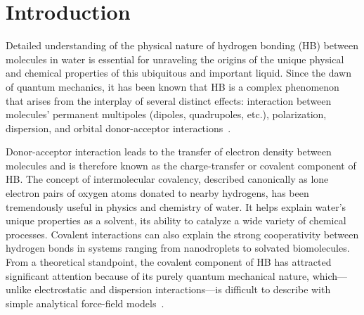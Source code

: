 \documentclass[aps,prl,reprint,amsmath,amssymb]{revtex4-1}
\begin{document}
\maketitle


\section{Introduction} 

Detailed understanding of the physical nature of hydrogen bonding (HB) between molecules in water is essential for unraveling the origins of the unique physical and chemical properties of this ubiquitous and important liquid. 
Since the dawn of quantum mechanics, it has been known that HB is a complex phenomenon that arises from the interplay of several distinct effects: interaction between molecules' permanent multipoles (dipoles, quadrupoles, etc.), polarization, dispersion, and orbital donor-acceptor interactions~\cite{eisenberg2005structure}.

Donor-acceptor interaction leads to the transfer of electron density between molecules and is therefore known as the charge-transfer or covalent component of HB. 
The concept of intermolecular covalency, described canonically as lone electron pairs of oxygen atoms donated to nearby hydrogens, has been tremendously useful in physics and chemistry of water.
It helps explain water's unique properties as a solvent, its ability to catalyze a wide variety of chemical processes. Covalent interactions can also explain the strong cooperativity between hydrogen bonds in systems ranging from nanodroplets to solvated biomolecules. 
From a theoretical standpoint, the covalent component of HB has attracted significant attention because of its purely quantum mechanical nature, which---unlike electrostatic and dispersion interactions---is difficult to describe with simple analytical force-field models~\cite{lee2011effects, gordon2013accurate}.
\end{document}
